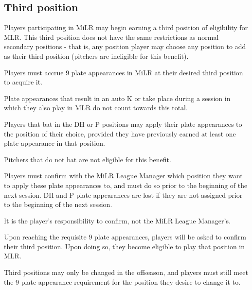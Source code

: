 \subsection{Third position}
\label{sec:Third position}
\begin{deepEnumerate}
    \item Players participating in MiLR may begin earning a third position of eligibility for MLR. This third position does not have the same restrictions as normal 
    secondary positions - that is, any position player may choose any position to add as their third position (pitchers are ineligible for this benefit).
    \item Players must accrue 9 plate appearances in MiLR at their desired third position to acquire it.    
    \begin{deepEnumerate}
        \item Plate appearances that result in an auto K or take place during a session in which they also play in MLR do not count towards this total.
        \item Players that bat in the DH or P positions may apply their plate appearances to the position of their choice, 
        provided they have previously earned at least one plate appearance in that position.
        \begin{deepEnumerate}
            \item Pitchers that do not bat are not eligible for this benefit.
            \item Players must confirm with the MiLR League Manager which position they want to apply these plate appearances to, and must do so prior to the beginning of the 
            next session. DH and P plate appearances are lost if they are not assigned prior to the beginning of the next session.
            \begin{deepEnumerate}
                \item It is the player's responsibility to confirm, not the MiLR League Manager's.
            \end{deepEnumerate}
        \end{deepEnumerate}
        \item Upon reaching the requisite 9 plate appearances, players will be asked to confirm their third position. 
        Upon doing so, they become eligible to play that position in MLR.
    \end{deepEnumerate}
    \item Third positions may only be changed in the offseason, 
    and players must still meet the 9 plate appearance requirement for the position they desire to change it to.

\end{deepEnumerate}
